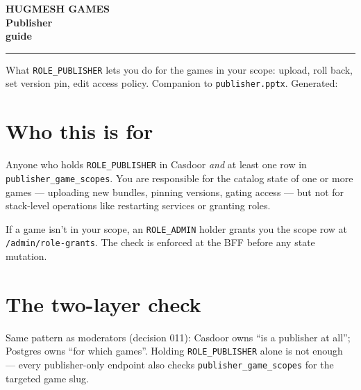 \documentclass[11pt,a4paper,openany]{book}
\begin{document}
\begin{titlepage}\thispagestyle{empty}
\noindent{}
\vspace*{4cm}\noindent
{\sffamily\bfseries
  {\color{snapAccentTwo}\fontsize{18}{22}\selectfont HUGMESH GAMES}\\[3mm]
  {\color{white}\fontsize{42}{50}\selectfont Publisher\\guide}\par}
\vspace{1.5cm}\noindent\color{white!75!snapAccentTwo}\rule{0.4\linewidth}{1.2pt}
\vspace{0.8cm}\noindent
{\sffamily\color{white!85}\large
What \texttt{ROLE\_PUBLISHER} lets you do for the games in your scope:
upload, roll back, set version pin, edit access policy.}
\vfill\noindent
{\sffamily\color{white!70}\small
Companion to \texttt{publisher.pptx}. Generated: \snapbuilddate{} \snapbuildtime}
\end{titlepage}

\frontmatter\pagestyle{empty}\tableofcontents\clearpage
\mainmatter\pagestyle{fancy}

\chapter{Who this is for}
Anyone who holds \texttt{ROLE\_PUBLISHER} in Casdoor \emph{and} at
least one row in \texttt{publisher\_game\_scopes}. You are responsible
for the catalog state of one or more games --- uploading new bundles,
pinning versions, gating access --- but not for stack-level operations
like restarting services or granting roles.

If a game isn't in your scope, an \texttt{ROLE\_ADMIN} holder grants
you the scope row at \texttt{/admin/role-grants}. The check is
enforced at the BFF before any state mutation.

\chapter{The two-layer check}
Same pattern as moderators (decision 011): Casdoor owns ``is a
publisher at all''; Postgres owns ``for which games''. Holding
\texttt{ROLE\_PUBLISHER} alone is not enough --- every
publisher-only endpoint also checks \texttt{publisher\_game\_scopes}
for the targeted game slug.
\end{document}
